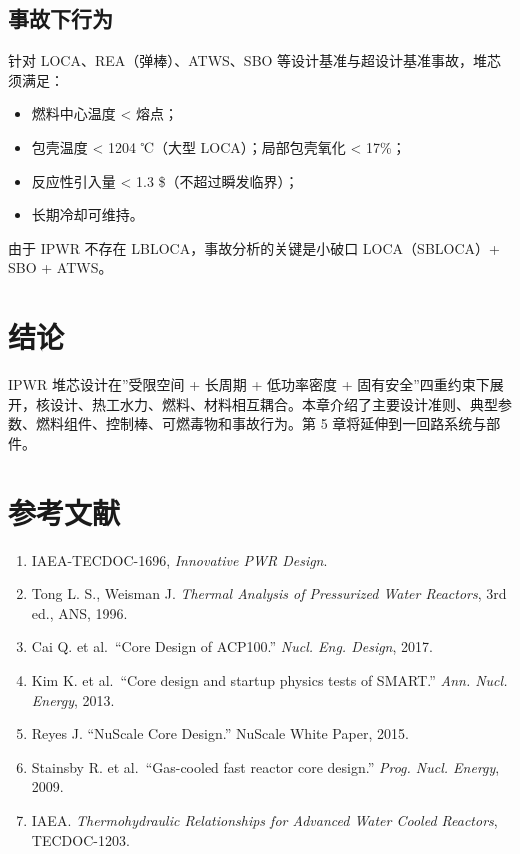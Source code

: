 \documentclass[
  UTF8,
  scheme=plain,
  fontsize=10pt,
  openany
]{ctexbook}
\begin{document}
\subsection{事故下行为}\label{ux4e8bux6545ux4e0bux884cux4e3a}

针对 LOCA、REA（弹棒）、ATWS、SBO
等设计基准与超设计基准事故，堆芯须满足：

\begin{itemize}
\tightlist
\item
  燃料中心温度 \textless{} 熔点；
\item
  包壳温度 \textless{} 1204 ℃（大型 LOCA）；局部包壳氧化 \textless{}
  17\%；
\item
  反应性引入量 \textless{} 1.3 \$（不超过瞬发临界）；
\item
  长期冷却可维持。
\end{itemize}

由于 IPWR 不存在 LBLOCA，事故分析的关键是小破口 LOCA（SBLOCA）+ SBO +
ATWS。

\section{结论}\label{ux7ed3ux8bba-2}

IPWR 堆芯设计在''受限空间 + 长周期 + 低功率密度 +
固有安全''四重约束下展开，核设计、热工水力、燃料、材料相互耦合。本章介绍了主要设计准则、典型参数、燃料组件、控制棒、可燃毒物和事故行为。第
5 章将延伸到一回路系统与部件。

\section{参考文献}\label{ux53c2ux8003ux6587ux732e-3}

\begin{enumerate}
\def\labelenumi{\arabic{enumi}.}
\tightlist
\item
  IAEA-TECDOC-1696, \emph{Innovative PWR Design}.
\item
  Tong L. S., Weisman J. \emph{Thermal Analysis of Pressurized Water
  Reactors}, 3rd ed., ANS, 1996.
\item
  Cai Q. et al.~``Core Design of ACP100.'' \emph{Nucl. Eng. Design},
  2017.
\item
  Kim K. et al.~``Core design and startup physics tests of SMART.''
  \emph{Ann. Nucl. Energy}, 2013.
\item
  Reyes J. ``NuScale Core Design.'' NuScale White Paper, 2015.
\item
  Stainsby R. et al.~``Gas-cooled fast reactor core design.''
  \emph{Prog. Nucl. Energy}, 2009.
\item
  IAEA. \emph{Thermohydraulic Relationships for Advanced Water Cooled
  Reactors}, TECDOC-1203.
\end{enumerate}
\end{document}
